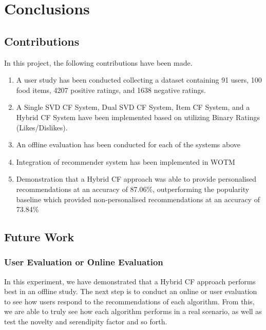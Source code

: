 \chapter{Conclusions}\label{C:con}

\section{Contributions}
In this project, the following contributions have been made. 
\begin{enumerate}
	\item{A user study has been conducted collecting a dataset containing 91 users, 100 food items, 4207 positive ratings, and 1638 negative ratings.}
	\item{A Single SVD CF System, Dual SVD CF System, Item CF System, and a Hybrid CF System have been implemented based on utilizing Binary Ratings (Likes/Dislikes).}
	\item{An offline evaluation has been conducted for each of the systems above}
	\item{Integration of recommender system has been implemented in WOTM}
	\item{Demonstration that a Hybrid CF approach was able to provide personalised recommendations at an accuracy of 87.06\%, outperforming the popularity baseline which provided non-personalised recommendations at an accuracy of 73.84\%}
\end{enumerate}
\section{Future Work}

\subsection{User Evaluation or Online Evaluation}
In this experiment, we have demonstrated that a Hybrid CF approach performs best in an offline study. The next step is to conduct an online or user evaluation to see how users respond to the recommendations of each algorithm. From this, we are able to truly see how each algorithm performs in a real scenario, as well as test the novelty and serendipity factor and so forth. 

